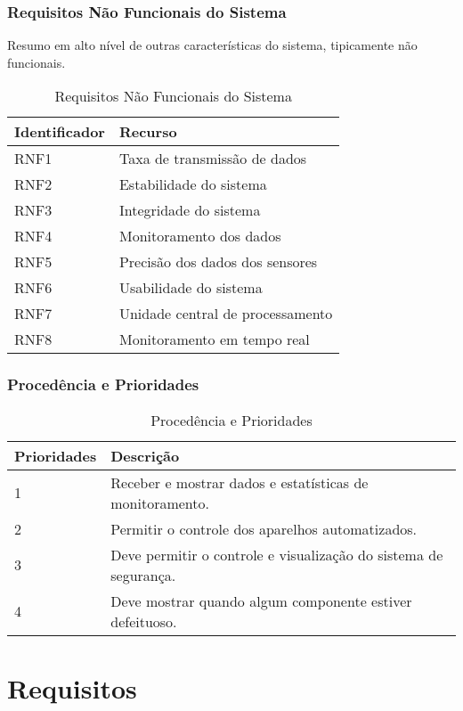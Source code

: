 \subsubsection{Requisitos Não Funcionais do Sistema}

	Resumo em alto nível de outras características do sistema, tipicamente não funcionais.

\begin{table}[H]
\begin{tabular}{|l|l|}
	\hline
	\textbf{Identificador} & \textbf{Recurso}\tabularnewline
	\hline
	\hline
	RNF1 & Taxa de transmissão de dados\tabularnewline
	\hline
	RNF2 & Estabilidade do sistema\tabularnewline
	\hline
	RNF3 & Integridade do sistema\tabularnewline
	\hline
	RNF4 & Monitoramento dos dados\tabularnewline
	\hline
	RNF5 & Precisão dos dados dos sensores\tabularnewline
	\hline
	RNF6 & Usabilidade do sistema\tabularnewline
	\hline
	RNF7 & Unidade central de processamento\tabularnewline
	\hline
	RNF8 & Monitoramento em tempo real\tabularnewline
	\hline
\end{tabular}
\caption{Requisitos Não Funcionais do Sistema}
\label{Requisitos_nao_Funcionais_do_Sistema}
\end{table}

\subsubsection{Procedência e Prioridades}

\begin{table}[H]
\begin{tabular}{|l|l|}
	\hline
	\textbf{Prioridades} & \textbf{Descrição}\tabularnewline
	\hline
	\hline
	1 & Receber e mostrar dados e estatísticas de monitoramento. \tabularnewline
	\hline
	2 & Permitir o controle dos aparelhos automatizados. \tabularnewline
	\hline
	3 & Deve permitir o controle e visualização do sistema de segurança. \tabularnewline
	\hline
	4 & Deve mostrar quando algum componente estiver defeituoso. \tabularnewline
	\hline
\end{tabular}
\caption{Procedência e Prioridades}
\label{Procedencia_e_Prioridades}
\end{table}

\section{Requisitos}
\label{sec:requisitos}

